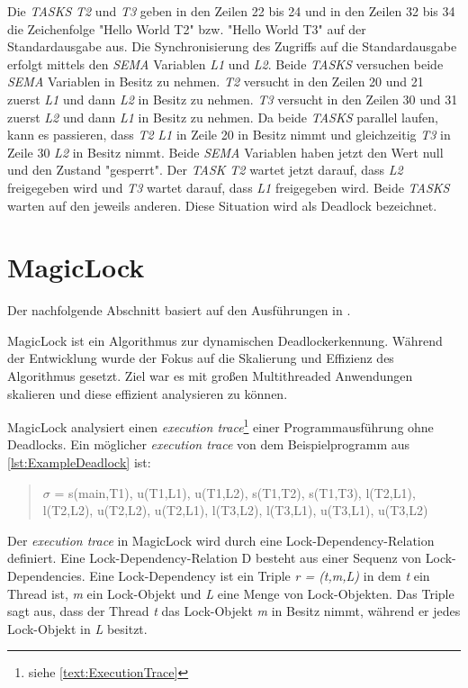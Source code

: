 Die \textit{TASKS} \textit{T2} und \textit{T3} geben in den Zeilen 22 bis 24 und in den Zeilen 32 bis 34 die Zeichenfolge "Hello World T2" bzw. "Hello World T3" auf der Standardausgabe aus. Die Synchronisierung des Zugriffs auf die Standardausgabe erfolgt mittels den \textit{SEMA} Variablen \textit{L1} und \textit{L2}. Beide \textit{TASKS} versuchen beide \textit{SEMA} Variablen in Besitz zu nehmen. \textit{T2} versucht in den Zeilen 20 und 21 zuerst \textit{L1} und dann \textit{L2} in Besitz zu nehmen. \textit{T3} versucht in den Zeilen 30 und 31 zuerst \textit{L2} und dann \textit{L1} in Besitz zu nehmen. Da beide \textit{TASKS} parallel laufen, kann es passieren, dass \textit{T2} \textit{L1} in Zeile 20 in Besitz nimmt und gleichzeitig \textit{T3} in Zeile 30 \textit{L2} in Besitz nimmt. Beide \textit{SEMA} Variablen haben jetzt den Wert null und den Zustand "gesperrt". Der \textit{TASK} \textit{T2} wartet jetzt darauf, dass \textit{L2} freigegeben wird und \textit{T3} wartet darauf, dass \textit{L1} freigegeben wird. Beide \textit{TASKS} warten auf den jeweils anderen. Diese Situation wird als Deadlock bezeichnet.

\section{MagicLock}
\label{section:MagicLock}
Der nachfolgende Abschnitt basiert auf den Ausführungen in \autocite{MagicLock}.

MagicLock ist ein Algorithmus zur dynamischen Deadlockerkennung. Während der Entwicklung wurde der Fokus auf die Skalierung und Effizienz des Algorithmus gesetzt. Ziel war es mit großen Multithreaded Anwendungen skalieren und diese effizient analysieren zu können.

MagicLock analysiert einen \textit{execution trace}\footnote{siehe \cref{text:ExecutionTrace}} einer Programmausführung ohne Deadlocks. Ein möglicher \textit{execution trace} von dem Beispielprogramm aus \cref{lst:ExampleDeadlock} ist:
\begin{quote}
  \textbf{$\sigma$} = s(main,T1), u(T1,L1), u(T1,L2), s(T1,T2), s(T1,T3), l(T2,L1), l(T2,L2), u(T2,L2), u(T2,L1), l(T3,L2), l(T3,L1), u(T3,L1), u(T3,L2)
\end{quote}
Der \textit{execution trace} in MagicLock wird durch eine Lock-Dependency-Relation definiert. Eine Lock-Dependency-Relation D besteht aus einer Sequenz von Lock-Dependencies. Eine Lock-Dependency ist ein Triple \textit{r = (t,m,L)} in dem \textit{t} ein Thread ist, \textit{m} ein Lock-Objekt und \textit{L} eine Menge von Lock-Objekten. Das Triple sagt aus, dass der Thread \textit{t} das Lock-Objekt \textit{m} in Besitz nimmt, während er jedes Lock-Objekt in \textit{L} besitzt.

